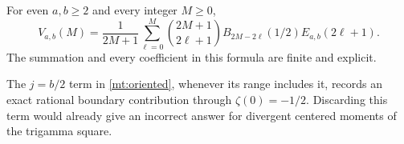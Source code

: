 \begin{theorem}
\label{mt:all-moments}
For even $a,b\ge2$ and every integer $M\ge0$,
\begin{equation}\label{mt:moment-formula}
 \boxed{\displaystyle
 V_{a,b}(M)=\frac1{2M+1}\sum_{\ell=0}^{M}
  \binom{2M+1}{2\ell+1}B_{2M-2\ell}(1/2)
                          E_{a,b}(2\ell+1).}
\end{equation}
The summation and every coefficient in this formula are finite and
explicit.
\end{theorem}

The $j=b/2$ term in \eqref{mt:oriented}, whenever its range includes
it, records an exact rational boundary contribution through
$\zeta(0)=-1/2$. Discarding this term would already give an incorrect
answer for divergent centered moments of the trigamma square.

